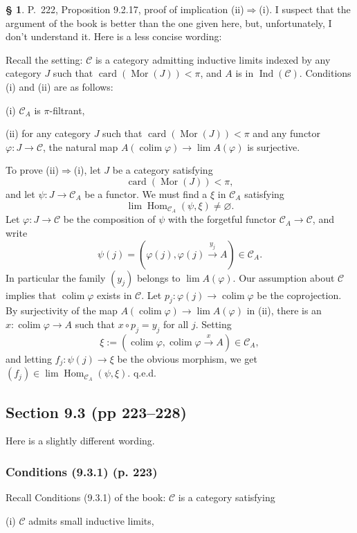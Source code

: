 \documentclass[12pt]{article}
\theoremstyle{remark}
\theoremstyle{definition}
\newtheorem{s}[thm]{\S}
\newcommand{\nn}{\noindent}
\newcommand{\C}{\mathcal C}
\newcommand{\pp}{\varphi}
\newcommand{\then}{\Rightarrow}
\newcommand{\xr}{\xrightarrow}
\DeclareMathOperator*{\colim}{colim}
\DeclareMathOperator{\card}{card}
\DeclareMathOperator{\Hom}{Hom}
\DeclareMathOperator{\Ind}{Ind}
\DeclareMathOperator{\Mor}{Mor}
\begin{document}
%

\begin{s} 
P.~222, Proposition 9.2.17, proof of implication (ii)$\then$(i). I suspect that the argument of the book is better than the one given here, but, unfortunately, I don't understand it. Here is a less concise wording:

Recall the setting: $\C$ is a category admitting inductive limits indexed by any category $J$ such that $\card(\Mor(J))<\pi$, and $A$ is in $\Ind(\C)$. Conditions (i) and (ii) are as follows: 

\nn(i) $\C_A$ is $\pi$-filtrant, 

\nn(ii) for any category $J$ such that $\card(\Mor(J))<\pi$ and any functor $\pp:J\to\C$, the natural map $A(\colim\pp)\to\lim A(\pp)$ is surjective. 

To prove (ii)$\then$(i), let $J$ be a category satisfying 
$$
\card(\Mor(J))<\pi,
$$ 
and let $\psi:J\to\C_A$ be a functor. We must find a $\xi$ in $\C_A$ satisfying 
$$
\lim\Hom_{\C_A}(\psi,\xi)\neq\varnothing.
$$ 
Let $\pp:J\to\C$ be the composition of $\psi$ with the forgetful functor $\C_A\to\C$, and write 
$$
\psi(j)=\left(\pp(j),\pp(j)\xr{y_j}A\right)\in\C_A.
$$ 
In particular the family $(y_j)$ belongs to $\lim A(\pp)$. Our assumption about $\C$ implies that $\colim\pp$ exists in $\C$. Let $p_j:\pp(j)\to\colim\pp$ be the coprojection. By surjectivity of the map $A(\colim\pp)\to\lim A(\pp)$ in (ii), there is an $x:\colim\pp\to A$ such that $x\circ p_j=y_j$ for all $j$. Setting 
$$
\xi:=\left(\colim\pp,\colim\pp\xr x A\right)\in\C_A,
$$ 
and letting $f_j:\psi(j)\to\xi$ be the obvious morphism, we get $(f_j)\in\lim\Hom_{\C_A}(\psi,\xi)$. q.e.d. 
\end{s}


\subsection{Section 9.3 (pp 223--228)}\label{s934}

Here is a slightly different wording. 

\subsubsection{Conditions (9.3.1) (p. 223)}\label{931}

Recall Conditions (9.3.1) of the book: $\C$ is a category satisfying  

(i) $\C$ admits small inductive limits,
\end{document}
